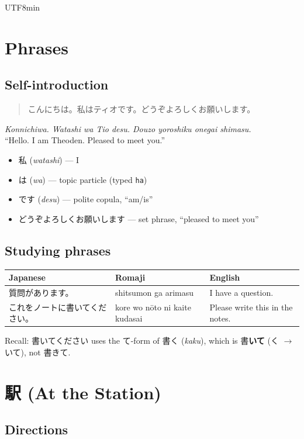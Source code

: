 \documentclass[11pt]{article}
\begin{document}
\begin{CJK}{UTF8}{min}
\section{Phrases}

\subsection{Self-introduction}
\begin{quote}
こんにちは。私はティオです。どうぞよろしくお願いします。
\end{quote}
\emph{Konnichiwa. Watashi wa Tio desu. Douzo yoroshiku onegai shimasu.}\\
``Hello. I am Theoden. Pleased to meet you.''

\begin{itemize}
  \item 私 (\emph{watashi}) --- I
  \item は (\emph{wa}) --- topic particle (typed \texttt{ha})
  \item です (\emph{desu}) --- polite copula, ``am/is''
  \item どうぞよろしくお願いします --- set phrase, ``pleased to meet you''
\end{itemize}

\subsection{Studying phrases}
\begin{center}
\begin{tabular}{@{}lll@{}}
\toprule
Japanese & Romaji & English \\
\midrule
質問があります。 & shitsumon ga arimasu & I have a question. \\
これをノートに書いてください。 & kore wo nōto ni kaite kudasai & Please write this in the notes. \\
\bottomrule
\end{tabular}
\end{center}
Recall: 書いてください uses the て-form of 書く (\emph{kaku}), which is 書\textbf{いて}
(く $\rightarrow$ いて), not 書きて.

\section{駅 (At the Station)}

\subsection{Directions}


\end{CJK}
\end{document}
